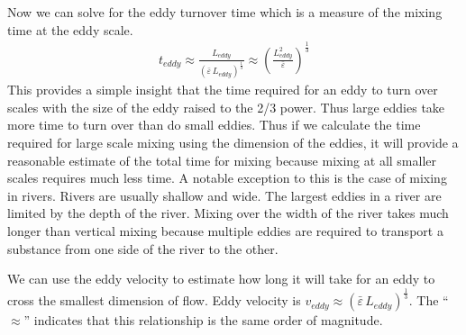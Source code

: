 \documentclass[letterpaper,10pt,english]{sphinxmanual}
\begin{document}
Now we can solve for the eddy turnover time which is a measure of the mixing time at the eddy scale.
\begin{equation}\label{equation:Rapid_Mix/RM_Derivations:Rapid_Mix/RM_Derivations:38}
\begin{split}t_{eddy} \approx \frac{L_{eddy}}{\left( \bar\varepsilon \, L_{eddy} \right)^\frac{1}{3}} \approx \left( \frac{L_{eddy}^2}{ \bar\varepsilon }\right)^\frac{1}{3}\end{split}
\end{equation}
This provides a simple insight that the time required for an eddy to turn over scales with the size of the eddy raised to the 2/3 power. Thus large eddies take more time to turn over than do small eddies. Thus if we calculate the time required for large scale mixing using the dimension of the eddies, it will provide a reasonable estimate of the total time for mixing because mixing at all smaller scales requires much less time. A notable exception to this is the case of mixing in rivers. Rivers are usually shallow and wide. The largest eddies in a river are limited by the depth of the river. Mixing over the width of the river takes much longer than vertical mixing because multiple eddies are required to transport a substance from one side of the river to the other.

We can use the eddy velocity to estimate how long it will take for an eddy to cross the smallest dimension of flow. Eddy velocity is \(v_{eddy} \approx \left( \bar\varepsilon \, L_{eddy} \right)^\frac{1}{3}\).
The “\(\approx\)” indicates that this relationship is the same order of magnitude.
\end{document}
